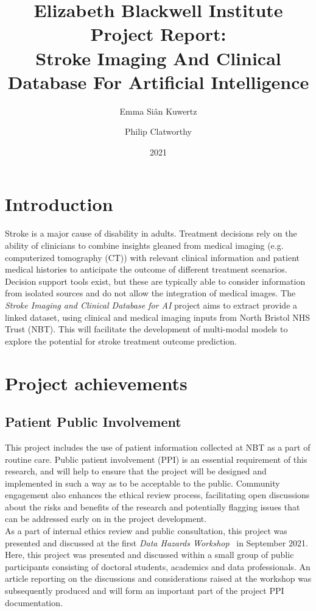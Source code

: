 \documentclass{article}
\title{
  Elizabeth Blackwell Institute Project Report:\\
  Stroke Imaging And Clinical Database For Artificial
  Intelligence
}
\author[1]{Emma Si\^{a}n Kuwertz}
\author[2,3]{Philip Clatworthy}
\affil[1]{Jean Golding Institute, University of Bristol}
\affil[2]{North Bristol NHS Trust}
\affil[3]{Bristol Medical School, University of Bristol}
\date{2021}
\begin{document}
\maketitle
\section{Introduction}

Stroke is a major cause of disability in adults. Treatment
decisions rely on the ability of clinicians to combine insights
gleaned from medical imaging (e.g. computerized tomography (CT)) with
relevant clinical information and patient medical histories to anticipate the outcome of different treatment
scenarios. Decision support tools exist, but these are typically able
to consider information from isolated sources and do not allow the
integration of medical images. The \textit{Stroke Imaging and Clinical
Database for AI} project aims to extract provide a linked dataset,
using clinical and medical imaging inputs from North Bristol NHS Trust (NBT). 
This will facilitate the development of multi-modal models to explore the potential for stroke treatment outcome
prediction.\\



\section{Project achievements}



\subsection{Patient Public Involvement}

This project includes the use of patient information collected at NBT as a part
of routine care. Public patient involvement (PPI) is an essential
requirement of this research, and will help to ensure that the project
will be designed and implemented in such a way as to be acceptable to
the public. Community engagement also enhances the ethical
review process, facilitating open discussions about the risks and
benefits of the research and potentially flagging issues that can be
addressed early on in the project development.\\

As a part of internal ethics review and public consultation, this
project was presented and discussed at the first \textit{Data Hazards
  Workshop}~\cite{data-hazards-workshop} in September 2021. Here, this
project was presented and discussed within a small group of public
participants consisting of doctoral students, academics and data
professionals. An article
reporting on the discussions and considerations raised at the
workshop was subsequently produced and will form an important part of
the project PPI documentation.\\
\end{document}
